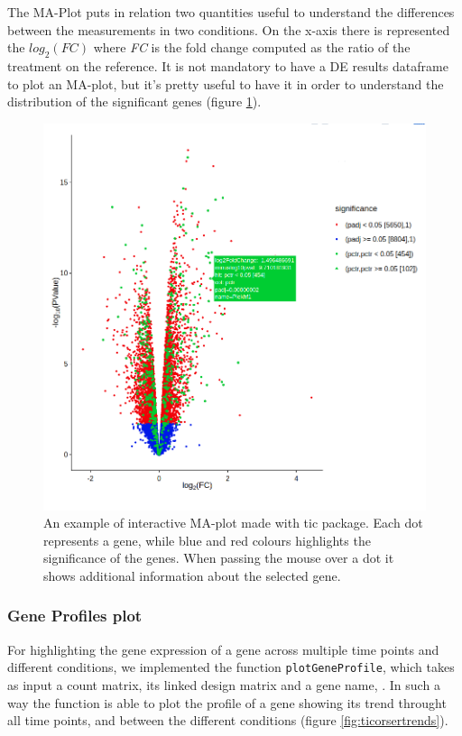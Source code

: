 The MA-Plot puts in relation two quantities useful to understand the differences between the measurements in two conditions.
On the x-axis there is represented the $log_2(FC)$ where \textit{FC} is the fold change computed as the ratio of the treatment on the reference.
It is not mandatory to have a DE results dataframe to plot an MA-plot, but it's pretty useful to have it in order to understand the distribution of the significant genes (figure \ref{fig:ticorsermaplot}).
 

\begin{figure}[H]
\includegraphics[width=\textwidth,height=\textheight,keepaspectratio]{img/ticorser/volcano_example.png}
\caption[ticorser MAplot]{An example of interactive MA-plot made with \gls{tic} package. Each dot represents a gene, while blue and red colours highlights the significance of the genes. When passing the mouse over a dot it shows additional information about the selected gene.}
\label{fig:ticorsermaplot}
\centering
\end{figure}


\subsubsection{Gene Profiles plot}
For highlighting the gene expression of a gene across multiple time points and different conditions, we implemented the function \lstinline!plotGeneProfile!, which takes as input a count matrix, its linked design matrix and a gene name, .
In such a way the function is able to plot the profile of a gene showing its trend throught all time points, and between the different conditions (figure \ref{fig:ticorsertrends}).

